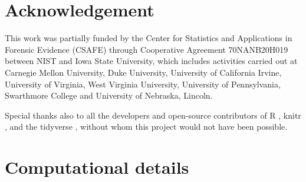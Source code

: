 \hypertarget{acknowledgement}{%
\section{Acknowledgement}\label{acknowledgement}}

This work was partially funded by the Center for Statistics and
Applications in Forensic Evidence (CSAFE) through Cooperative Agreement
70NANB20H019 between NIST and Iowa State University, which includes
activities carried out at Carnegie Mellon University, Duke University,
University of California Irvine, University of Virginia, West Virginia
University, University of Pennsylvania, Swarthmore College and
University of Nebraska, Lincoln.

Special thanks also to all the developers and open-source contributors
of R \citep{R}, knitr \citep{knitr1, knitr2}, and the tidyverse
\citep{tidyverse}, without whom this project would not have been
possible.

\hypertarget{computational-details}{%
\section{Computational details}\label{computational-details}}


